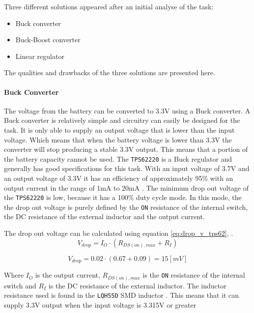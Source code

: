 Three different solutions appeared after an initial analyse of the task:

\begin{itemize}
	\item Buck converter
	\item Buck-Boost converter
	\item Linear regulator
\end{itemize}

The qualities and drawbacks of the three solutions are presented here.

\paragraph{Buck Converter}
The voltage from the battery can be converted to 3.3V using a Buck converter.
A Buck converter is relatively simple and circuitry can easily be designed for the task.
It is only able to supply an output voltage that is lower than the input voltage.
Which means that when the battery voltage is lower than 3.3V the converter will stop producing a stable 3.3V output.
This means that a portion of the battery capacity cannot be used.
The \texttt{TPS62220} is a Buck regulator and generally has good specifications for this task. 
With an input voltage of 3.7V and an output voltage of 3.3V it has an efficiency of approximately 95\% with an output current in the range of 1mA to 20mA \cite{TPS6222}.
The minimum drop out voltage of the \texttt{TPS62220} is low, because it has a 100\% duty cycle mode.
In this mode, the the drop out voltage is purely defined by the \texttt{ON} resistance of the internal switch, the DC resistance of the external inductor and the output current.

The drop out voltage can be calculated using equation \ref{eq:drop_v_tps62}, \cite{TPS6222}.
\begin{equation}
	V_{drop} = I_{O} \cdot (R_{DS(on),max}+R_I)
	\label{eq:drop_v_tps62}
\end{equation}

\begin{equation}
	V_{drop} = 0.02 \cdot (0.67+0.09) = 15 [mV]
	\label{eq:drop_v_tps62_2}
\end{equation}

Where $I_O$ is the output current, $R_{DS(on),max}$ is the \texttt{ON} resistance of the internal switch and $R_I$ is the DC resistance of the external inductor.
The inductor resistance used is found in the \texttt{LQH55D} SMD inductor \cite{LQH55D}.
This means that it can supply 3.3V output when the input voltage is 3.315V or greater



